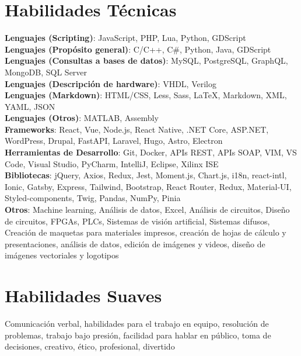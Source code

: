 \documentclass[letterpaper,11pt]{article}
\begin{document}
\section{Habilidades Técnicas}
\begin{itemize}[leftmargin=0.05in, label={}, itemsep=2pt, parsep=2pt]
  \small{\item{
    \textbf{Lenguajes (Scripting)}{: JavaScript, PHP, Lua, Python, GDScript} \\
    \textbf{Lenguajes (Propósito general)}{: C/C++, C\#, Python, Java, GDScript} \\
    \textbf{Lenguajes (Consultas a bases de datos)}{: MySQL, PostgreSQL, GraphQL, MongoDB, SQL Server} \\
    \textbf{Lenguajes (Descripción de hardware)}{: VHDL, Verilog} \\
    \textbf{Lenguajes (Markdown)}{: HTML/CSS, Less, Sass, LaTeX, Markdown, XML, YAML, JSON} \\
    \textbf{Lenguajes (Otros)}{: MATLAB, Assembly} \\
    \textbf{Frameworks}{: React, Vue, Node.js, React Native, .NET Core, ASP.NET, WordPress, Drupal, FastAPI, Laravel, Hugo, Astro, Electron} \\
    \textbf{Herramientas de Desarrollo}{: Git, Docker, APIs REST, APIs SOAP, VIM, VS Code, Visual Studio, PyCharm, IntelliJ, Eclipse, Xilinx ISE} \\
    \textbf{Bibliotecas}{: jQuery, Axios, Redux, Jest, Moment.js, Chart.js, i18n, react-intl, Ionic, Gatsby, Express, Tailwind, Bootstrap, React Router, Redux, Material-UI, Styled-components, Twig, Pandas, NumPy, Pinia} \\
    \textbf{Otros}{: Machine learning, Análisis de datos, Excel, Análisis de circuitos, Diseño de circuitos, FPGAs, PLCs, Sistemas de visión artificial, Sistemas difusos, Creación de maquetas para materiales impresos, creación de hojas de cálculo y presentaciones, análisis de datos, edición de imágenes y videos, diseño de imágenes vectoriales y logotipos} \
  }}
\end{itemize}

\section{Habilidades Suaves}
\begin{itemize}[leftmargin=0.05in, label={}]
  \small{
    \item{Comunicación verbal, habilidades para el trabajo en equipo, resolución de problemas, trabajo bajo presión, facilidad para hablar en público, toma de decisiones, creativo, ético, profesional, divertido}
  }
\end{itemize}

\end{document}
